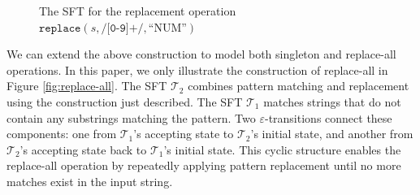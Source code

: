\begin{figure}[h] \centering
  \caption{The SFT for the replacement operation \\ $\texttt{replace}(s, \texttt{/[0-9]+/}, \text{``NUM''})$}
  \label{fig-rearranged-automata}
  \end{figure}

  We can extend the above construction to model both singleton and replace-all operations. In this paper, we only illustrate the construction of replace-all in Figure \ref{fig:replace-all}. The SFT $\mathcal{T}_2$ combines pattern matching and replacement using the construction just described. The SFT $\mathcal{T}_1$ matches strings that do not contain any substrings matching the pattern. Two $\varepsilon$-transitions connect these components: one from $\mathcal{T}_1$'s accepting state to $\mathcal{T}_2$'s initial state, and another from $\mathcal{T}_2$'s accepting state back to $\mathcal{T}_1$'s initial state. This cyclic structure enables the replace-all operation by repeatedly applying pattern replacement until no more matches exist in the input string.




